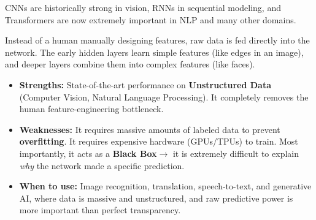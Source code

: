 \documentclass[11pt]{article}
\theoremstyle{smallexample}
\begin{document}
CNNs are historically strong in vision, RNNs in sequential modeling, and Transformers are now extremely important in NLP and many other domains.


Instead of a human manually designing features, raw data is fed directly into the network. The early hidden layers learn simple features (like edges in an image), and deeper layers combine them into complex features (like faces).

\begin{itemize}
    \item \textbf{Strengths:} State-of-the-art performance on \textbf{Unstructured Data} (Computer Vision, Natural Language Processing). It completely removes the human feature-engineering bottleneck.
    \item \textbf{Weaknesses:} It requires massive amounts of labeled data to prevent \textbf{overfitting}. It requires expensive hardware (GPUs/TPUs) to train. Most importantly, it acts as a \textbf{Black Box}$\rightarrow$ it is extremely difficult to explain \textit{why} the network made a specific prediction.
    \item \textbf{When to use:} Image recognition, translation, speech-to-text, and generative AI, where data is massive and unstructured, and raw predictive power is more important than perfect transparency.
\end{itemize}
\end{document}

